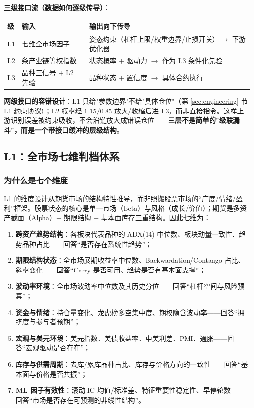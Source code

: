 \textbf{三级接口流（数据如何逐级传导）}：
\begin{center}
\footnotesize
\renewcommand{\arraystretch}{1.4}
\begin{tabular}{@{}p{2.2cm}>{\raggedright\arraybackslash}p{4.4cm}>{\raggedright\arraybackslash}p{4.4cm}@{}}
\toprule
级 & 输入 & 输出向下传导 \\
\midrule
L1 & 七维全市场因子 & 姿态约束（杠杆上限/权重边界/止损开关）$\to$ 下游优化器 \\
L2 & 9 条产业链等权指数 & 状态概率 $+$ 驱动力 $\to$ 作为 L3 条件化先验 \\
L3 & 品种三信号 $+$ L2 先验 & 品种状态 $+$ 置信度 $\to$ 具体合约执行 \\
\bottomrule
\end{tabular}
\end{center}
\textbf{两级接口的容错设计}：L1 只给"参数边界"不给"具体仓位"（第 \ref{sec:engineering} 节 L1 约束协议）；L2 概率经 $1.15/0.85$ 放大/收缩后进 L3，而非直接指令。这样上游识别误差被约束吸收，不会沿链放大成错误仓位——\textbf{三层不是简单的"级联漏斗"，而是一个带接口缓冲的层级结构}。

\subsection{L1：全市场七维判档体系}

\subsubsection{为什么是七个维度}

L1 的维度设计从期货市场的结构特性推导，而非照搬股票市场的“广度/情绪/盈利”框架。股票状态的核心是单一市场（Beta）与风格（成长/价值）；期货是多资产截面（Alpha）$+$ 期限结构 $+$ 基本面库存三重结构。因此七维为：

\begin{enumerate}[itemsep=2pt]
\item \textbf{跨资产趋势结构}：各板块代表品种的 ADX(14) 中位数、板块动量一致性、趋势品种占比——回答“是否存在系统性趋势”；
\item \textbf{期限结构状态}：全市场展期收益率中位数、Backwardation/Contango 占比、斜率变化——回答“Carry 是否可用、趋势是否有基本面支撑”；
\item \textbf{波动率环境}：全市场波动率中位数及其历史分位——回答“杠杆空间与风险预算”；
\item \textbf{资金与情绪}：持仓量变化、龙虎榜多空集中度、期权隐含波动率——回答“拥挤度与参与者预期”；
\item \textbf{宏观与美元环境}：美元指数、美债收益率、中美利差、PMI、通胀——回答“宏观驱动是否存在”；
\item \textbf{库存与供需周期}：去库/累库品种占比、库存与价格方向的一致性——回答“基本面与价格是否共振”；
\item \textbf{ML 因子有效性}：滚动 IC 均值/标准差、特征重要性稳定性、早停轮数——回答“市场是否存在可预测的非线性结构”。
\end{enumerate}

